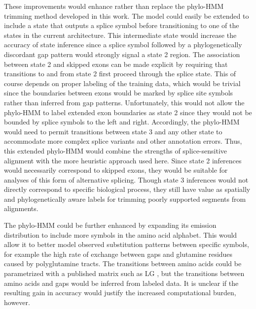 \documentclass[10pt,letterpaper]{article}
\begin{document}
These improvements would enhance rather than replace the phylo-HMM trimming method developed in this work. The model could easily be extended to include a state that outputs a splice symbol before transitioning to one of the states in the current architecture. This intermediate state would increase the accuracy of state inference since a splice symbol followed by a phylogenetically discordant gap pattern would strongly signal a state 2 region. The association between state 2 and skipped exons can be made explicit by requiring that transitions to and from state 2 first proceed through the splice state. This of course depends on proper labeling of the training data, which would be trivial since the boundaries between exons would be marked by splice site symbols rather than inferred from gap patterns. Unfortunately, this would not allow the phylo-HMM to label extended exon boundaries as state 2 since they would not be bounded by splice symbols to the left and right. Accordingly, the phylo-HMM would need to permit transitions between state 3 and any other state to accommodate more complex splice variants and other annotation errors. Thus, this extended phylo-HMM would combine the strengths of splice-sensitive alignment with the more heuristic approach used here. Since state 2 inferences would necessarily correspond to skipped exons, they would be suitable for analyses of this form of alternative splicing. Though state 3 inferences would not directly correspond to specific biological process, they still have value as spatially and phylogenetically aware labels for trimming poorly supported segments from alignments.

The phylo-HMM could be further enhanced by expanding its emission distribution to include more symbols in the amino acid alphabet. This would allow it to better model observed substitution patterns between specific symbols, for example the high rate of exchange between gaps and glutamine residues caused by polyglutamine tracts. The transitions between amino acids could be parametrized with a published matrix such as LG \cite{Le2008}, but the transitions between amino acids and gaps would be inferred from labeled data. It is unclear if the resulting gain in accuracy would justify the increased computational burden, however.
\end{document}
